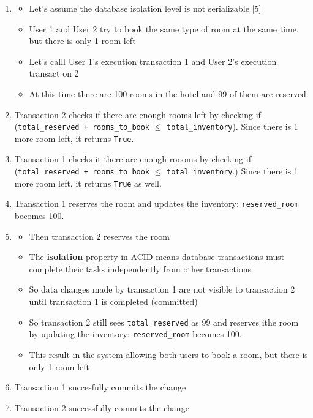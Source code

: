 \documentclass{report}
\theoremstyle{definition}
\begin{document}
\begin{enumerate}
\item

\begin{itemize}
\item
Let's assume the database isolation level is not serializable [5]
\item
User 1 and User 2 try to book the same type of room at the same time, but there is only 1 room left
\item
Let's calll User 1's execution transaction 1 and User 2's execution transact  on 2
\item
At this time there are 100 rooms in the hotel and 99 of them are reserved
\end{itemize}

\item
Transaction 2 checks if there are enough rooms left by checking if (\lstinline|total_reserved + rooms_to_book| $\leq$ \lstinline|total_inventory|). Since there is 1 more room left, it returns \lstinline|True|.

\item
Transaction 1 checks it there are enough roooms by checking if (\lstinline|total_reserved + rooms_to_book| $\leq$ \lstinline|total_inventory|.) Since there is 1 more room left, it returns \lstinline|True| as well.

\item
Transaction 1 reserves the room and updates the inventory: \lstinline|reserved_room| becomes 100.
\item

\begin{itemize}
\item
Then transaction 2 reserves the room
\item
The \textbf{isolation} property in ACID means database transactions must complete their tasks independently from other transactions
\item
So data changes made by transaction 1 are not visible to transaction 2 until transaction 1 is completed (committed)
\item
So transaction 2 still sees \lstinline|total_reserved| as 99 and reserves ithe room by updating the inventory: \lstinline|reserved_room| becomes 100.
\item
This result in the system allowing both users to book a room, but there is only 1 room left
\end{itemize}

\item
Transaction 1 succesfully commits the change
\item
Transaction 2 successfully commits the change
\end{enumerate}
\end{document}
